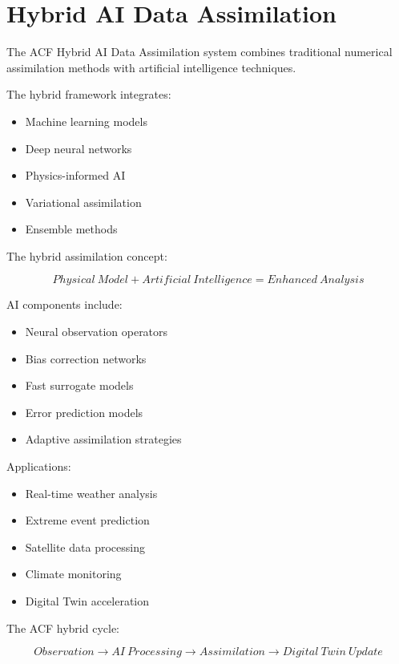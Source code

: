 \section{Hybrid AI Data Assimilation}



The ACF Hybrid AI Data Assimilation system combines
traditional numerical assimilation methods with artificial
intelligence techniques.



The hybrid framework integrates:


\begin{itemize}

\item Machine learning models

\item Deep neural networks

\item Physics-informed AI

\item Variational assimilation

\item Ensemble methods

\end{itemize}



The hybrid assimilation concept:


\[
Physical\ Model
+
Artificial\ Intelligence
=
Enhanced\ Analysis
\]



AI components include:


\begin{itemize}

\item Neural observation operators

\item Bias correction networks

\item Fast surrogate models

\item Error prediction models

\item Adaptive assimilation strategies

\end{itemize}



Applications:


\begin{itemize}

\item Real-time weather analysis

\item Extreme event prediction

\item Satellite data processing

\item Climate monitoring

\item Digital Twin acceleration

\end{itemize}



The ACF hybrid cycle:


\[
Observation
\rightarrow
AI\ Processing
\rightarrow
Assimilation
\rightarrow
Digital\ Twin\ Update
\]
